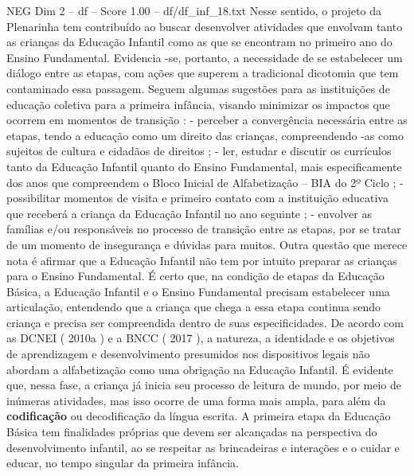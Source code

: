 \begin{textsample}{NEG Dim 2 – df – Score 1.00 – df/df\_inf\_18.txt}
Nesse sentido, o projeto da Plenarinha tem contribuído ao buscar desenvolver atividades que envolvam tanto as crianças da Educação Infantil como as que se encontram no primeiro ano do Ensino Fundamental.
Evidencia -se, portanto, a necessidade de se estabelecer um diálogo entre as etapas, com ações que superem a tradicional dicotomia que tem contaminado essa passagem.
Seguem algumas sugestões para as instituições de educação coletiva para a primeira infância, visando minimizar os impactos que ocorrem em momentos de transição : - perceber a convergência necessária entre as etapas, tendo a educação como um direito das crianças, compreendendo -as como sujeitos de cultura e cidadãos de direitos ; - ler, estudar e discutir os currículos tanto da Educação Infantil quanto do Ensino Fundamental, mais especificamente dos anos que compreendem o Bloco Inicial de Alfabetização – BIA do 2º Ciclo ; - possibilitar momentos de visita e primeiro contato com a instituição educativa que receberá a criança da Educação Infantil no ano seguinte ; - envolver as famílias e/ou responsáveis no processo de transição entre as etapas, por se tratar de um momento de insegurança e dúvidas para muitos.
Outra questão que merece nota é afirmar que a Educação Infantil não tem por intuito preparar as crianças para o Ensino Fundamental.
É certo que, na condição de etapas da Educação Básica, a Educação Infantil e o Ensino Fundamental precisam estabelecer uma articulação, entendendo que a criança que chega a essa etapa continua sendo criança e precisa ser compreendida dentro de suas especificidades.
De acordo com as DCNEI ( 2010a ) e a BNCC ( 2017 ), a natureza, a identidade e os objetivos de aprendizagem e desenvolvimento presumidos nos dispositivos legais não abordam a alfabetização como uma obrigação na Educação Infantil.
É evidente que, nessa fase, a criança já inicia seu processo de leitura de mundo, por meio de inúmeras atividades, mas isso ocorre de uma forma mais ampla, para além da \textbf{codificação} ou decodificação da língua escrita.
A primeira etapa da Educação Básica tem finalidades próprias que devem ser alcançadas na perspectiva do desenvolvimento infantil, ao se respeitar as brincadeiras e interações e o cuidar e educar, no tempo singular da primeira infância.

\end{textsample}

